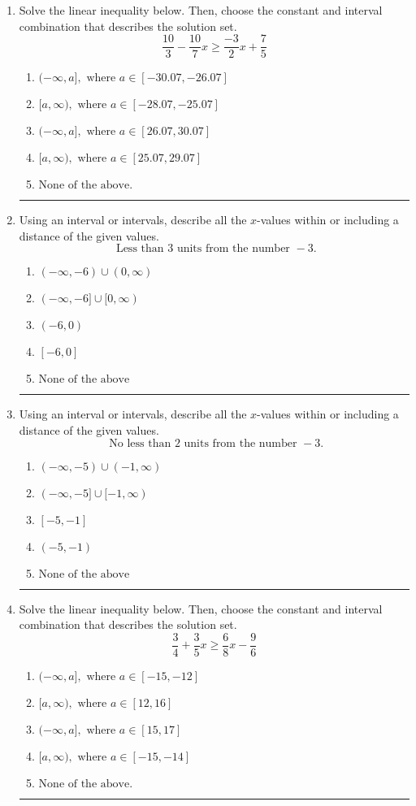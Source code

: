 \documentclass[14pt]{extbook}
\newcommand{\litem}[1]{\item#1\hspace*{-1cm}\rule{\textwidth}{0.4pt}}
\begin{document}
\begin{enumerate}
\litem{
Solve the linear inequality below. Then, choose the constant and interval combination that describes the solution set.\[ \frac{10}{3} - \frac{10}{7} x \geq \frac{-3}{2} x + \frac{7}{5} \]\begin{enumerate}[label=\Alph*.]
\item \( (-\infty, a], \text{ where } a \in [-30.07, -26.07] \)
\item \( [a, \infty), \text{ where } a \in [-28.07, -25.07] \)
\item \( (-\infty, a], \text{ where } a \in [26.07, 30.07] \)
\item \( [a, \infty), \text{ where } a \in [25.07, 29.07] \)
\item \( \text{None of the above}. \)

\end{enumerate} }
\litem{
Using an interval or intervals, describe all the $x$-values within or including a distance of the given values.\[ \text{ Less than } 3 \text{ units from the number } -3. \]\begin{enumerate}[label=\Alph*.]
\item \( (-\infty, -6) \cup (0, \infty) \)
\item \( (-\infty, -6] \cup [0, \infty) \)
\item \( (-6, 0) \)
\item \( [-6, 0] \)
\item \( \text{None of the above} \)

\end{enumerate} }
\litem{
Using an interval or intervals, describe all the $x$-values within or including a distance of the given values.\[ \text{ No less than } 2 \text{ units from the number } -3. \]\begin{enumerate}[label=\Alph*.]
\item \( (-\infty, -5) \cup (-1, \infty) \)
\item \( (-\infty, -5] \cup [-1, \infty) \)
\item \( [-5, -1] \)
\item \( (-5, -1) \)
\item \( \text{None of the above} \)

\end{enumerate} }
\litem{
Solve the linear inequality below. Then, choose the constant and interval combination that describes the solution set.\[ \frac{3}{4} + \frac{3}{5} x \geq \frac{6}{8} x - \frac{9}{6} \]\begin{enumerate}[label=\Alph*.]
\item \( (-\infty, a], \text{ where } a \in [-15, -12] \)
\item \( [a, \infty), \text{ where } a \in [12, 16] \)
\item \( (-\infty, a], \text{ where } a \in [15, 17] \)
\item \( [a, \infty), \text{ where } a \in [-15, -14] \)
\item \( \text{None of the above}. \)


\end{enumerate}}
\end{enumerate}
\end{document}
